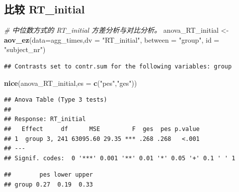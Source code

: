 \documentclass[
]{article}
\newenvironment{Shaded}{\begin{snugshade}}{\end{snugshade}}
\newcommand{\AttributeTok}[1]{\textcolor[rgb]{0.13,0.29,0.53}{#1}}
\newcommand{\CommentTok}[1]{\textcolor[rgb]{0.56,0.35,0.01}{\textit{#1}}}
\newcommand{\DecValTok}[1]{\textcolor[rgb]{0.00,0.00,0.81}{#1}}
\newcommand{\FunctionTok}[1]{\textcolor[rgb]{0.13,0.29,0.53}{\textbf{#1}}}
\newcommand{\NormalTok}[1]{#1}
\newcommand{\OtherTok}[1]{\textcolor[rgb]{0.56,0.35,0.01}{#1}}
\newcommand{\SpecialCharTok}[1]{\textcolor[rgb]{0.81,0.36,0.00}{\textbf{#1}}}
\newcommand{\StringTok}[1]{\textcolor[rgb]{0.31,0.60,0.02}{#1}}
\begin{document}
\subsection{比较 RT\_initial}\label{ux6bd4ux8f83-rt_initial-1}

\begin{Shaded}
\begin{Highlighting}[]
\CommentTok{\# 中位数方式的 RT\_initial 方差分析与对比分析。}
\NormalTok{anova\_RT\_initial }\OtherTok{\textless{}{-}} \FunctionTok{aov\_ez}\NormalTok{(}\AttributeTok{data=}\NormalTok{agg\_times,}\AttributeTok{dv =} \StringTok{"RT\_initial"}\NormalTok{, }\AttributeTok{between =} \StringTok{"group"}\NormalTok{, }\AttributeTok{id =} \StringTok{"subject\_nr"}\NormalTok{)}
\end{Highlighting}
\end{Shaded}

\begin{verbatim}
## Contrasts set to contr.sum for the following variables: group
\end{verbatim}

\begin{Shaded}
\begin{Highlighting}[]
\FunctionTok{nice}\NormalTok{(anova\_RT\_initial,}\AttributeTok{es =} \FunctionTok{c}\NormalTok{(}\StringTok{"pes"}\NormalTok{,}\StringTok{"ges"}\NormalTok{))}
\end{Highlighting}
\end{Shaded}

\begin{verbatim}
## Anova Table (Type 3 tests)
## 
## Response: RT_initial
##   Effect     df      MSE         F  ges  pes p.value
## 1  group 3, 241 63095.60 29.35 *** .268 .268   <.001
## ---
## Signif. codes:  0 '***' 0.001 '**' 0.01 '*' 0.05 '+' 0.1 ' ' 1
\end{verbatim}

\begin{Shaded}
\end{Shaded}

\begin{verbatim}
##        pes lower upper
## group 0.27  0.19  0.33
\end{verbatim}
\end{document}
